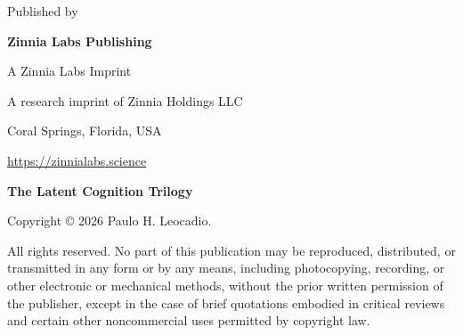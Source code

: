 \begin{titlepage}

    \vfill


    {\small Published by\par}

    \vspace{0.08in}

    {\Large\bfseries Zinnia Labs Publishing\par}

    \vspace{0.05in}

    {\small A Zinnia Labs Imprint\par}

    \vspace{0.15in}

    {\small
        A research imprint of Zinnia Holdings LLC\par
    }

    {\small
        Coral Springs, Florida, USA\par
    }

    \vspace{0.1in}

    {\small\url{https://zinnialabs.science}\par}

\end{titlepage}



\thispagestyle{empty}

\null
\vfill

\noindent
\textbf{The Latent Cognition Trilogy}

\vspace{0.1in}

\noindent
Copyright \copyright{} 2026 Paulo H. Leocadio.

\vspace{0.2in}

\noindent
All rights reserved. No part of this publication
may be reproduced, distributed, or transmitted
in any form or by any means, including
photocopying, recording, or other electronic
or mechanical methods, without the prior
written permission of the publisher, except
in the case of brief quotations embodied in
critical reviews and certain other noncommercial
uses permitted by copyright law.

